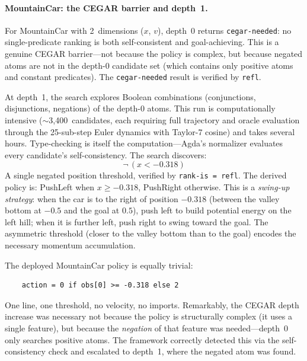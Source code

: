 \documentclass[9pt,a4paper]{article}
\theoremstyle{plain}
\theoremstyle{definition}
\theoremstyle{remark}
\begin{document}
\paragraph{MountainCar: the CEGAR barrier and depth~1.}
For MountainCar with 2~dimensions ($x$, $v$), depth~0 returns \texttt{cegar-needed}: no single-predicate ranking is both self-consistent and goal-achieving.  This is a genuine CEGAR barrier---not because the policy is complex, but because negated atoms are not in the depth-0 candidate set (which contains only positive atoms and constant predicates).  The \texttt{cegar-needed} result is verified by \texttt{refl}.

At depth~1, the search explores Boolean combinations (conjunctions, disjunctions, negations) of the depth-0 atoms.  This run is computationally intensive (${\sim}$3{,}400~candidates, each requiring full trajectory and oracle evaluation through the 25-sub-step Euler dynamics with Taylor-7 cosine) and takes several hours.  Type-checking is itself the computation---Agda's normalizer evaluates every candidate's self-consistency.  The search discovers:
\[
\boxed{\quad \lnot\,(x < {-0.318}) \quad}
\]
A single negated position threshold, verified by \texttt{rank-is~=~refl}.  The derived policy is: PushLeft when $x \geq -0.318$, PushRight otherwise.  This is a \emph{swing-up strategy}: when the car is to the right of position $-0.318$ (between the valley bottom at $-0.5$ and the goal at $0.5$), push left to build potential energy on the left hill; when it is further left, push right to swing toward the goal.  The asymmetric threshold (closer to the valley bottom than to the goal) encodes the necessary momentum accumulation.

The deployed MountainCar policy is equally trivial:

\begin{verbatim}
    action = 0 if obs[0] >= -0.318 else 2
\end{verbatim}

\noindent One line, one threshold, no velocity, no imports.  Remarkably, the CEGAR depth increase was necessary not because the policy is structurally complex (it uses a single feature), but because the \emph{negation} of that feature was needed---depth~0 only searches positive atoms.  The framework correctly detected this via the self-consistency check and escalated to depth~1, where the negated atom was found.
\end{document}

